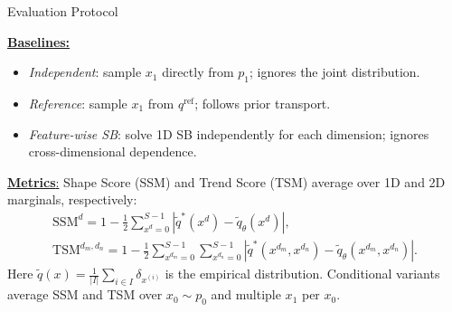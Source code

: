 \documentclass[final]{beamer}
\newlength{\colwidth}
\begin{document}
\begin{frame}[t]
\begin{columns}[t]
\begin{column}{\colwidth}
  \begin{block}{Evaluation Protocol}
        \begin{minipage}[t]{0.39\linewidth}
            \underline{\textbf{Baselines:}}
            \begin{itemize}\setlength{\itemindent}{0pt}
              \item \textit{Independent}: sample $x_1$ directly from $p_1$; ignores the joint distribution.
              \item \textit{Reference}: sample $x_1$ from $q^{\mathrm{ref}}$; follows prior transport.
              \item \textit{Feature-wise SB}: solve 1D SB independently for each dimension; ignores cross-dimensional dependence.
            \end{itemize}
        \end{minipage}
        \hfill
        \vrule
        \hfill
        \begin{minipage}[t]{0.58\linewidth}
            \underline{\textbf{Metrics}:}
            Shape Score (SSM) and Trend Score (TSM) average over 1D and 2D marginals, respectively:
            \vspace{-5mm}
            \begin{gather*}
                \mathrm{SSM}^d = 1-\frac12\sum_{x^d=0}^{S-1}\left|\tilde q^*(x^d)-\tilde q_\theta(x^d)\right|,
                \\[-2mm]
                \mathrm{TSM}^{d_m,d_n}=1-\frac12\sum_{x^{d_m}=0}^{S-1}\sum_{x^{d_n}=0}^{S-1}\left|\tilde q^*(x^{d_m},x^{d_n})-\tilde q_\theta(x^{d_m},x^{d_n})\right|.
            \end{gather*}
            Here $\tilde q(x)=\frac1{|I|}\sum_{i\in I}\delta_{x^{(i)}}$ is the empirical distribution. Conditional variants average SSM and TSM over $x_0\sim p_0$ and multiple $x_1$ per $x_0$.
        \end{minipage}
    \end{block}


\end{column}
\end{columns}
\end{frame}
\end{document}
